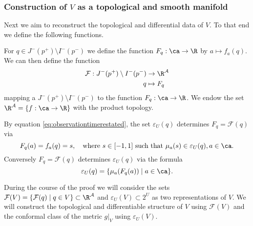 \subsubsection{Construction of $V$ as a topological and smooth manifold}
Next we aim to reconstruct the topological and differential data of $V$. To that end we define the following functions.

For $q\in J^-(p^+)\setminus I^-(p^-)$ we define the function $F_q:\ca\to\R$ by $a\mapsto f_a(q)$. We can then define the function 
\begin{align*}
    \mathcal{F}:J^-(p^+)\setminus I^-(p^-) &\to \R^\mathcal{A}\\
    q&\mapsto F_q
\end{align*} mapping a $J^-(p^+)\setminus I^-(p^-)$ to the function $F_q:\ca\to\R$. We endow the set $\R^\mathcal{A} = \{f:\ca\to \R\}$ with the product topology.

By equation \ref{eq:observationtimerestated}, the set $\varepsilon_U(q)$ determines $F_q=\mathcal{F}(q)$ via
\begin{equation}\label{eq:epsdetfq}
    F_q(a) = f_a(q) = s,\quad \text{where $s\in [-1,1]$ such that $\mu_a(s)\in \varepsilon_U(q), a\in \ca$}.
\end{equation}
Conversely $F_q=\mathcal{F}(q)$ determines $\varepsilon_U(q)$ via the formula
\begin{equation}\label{eq:fqdeteps}
    \varepsilon_U(q) = \{\mu_a(F_q(a)) \mid a\in \ca\}.
\end{equation}

During the course of the proof we will consider the sets $\mathcal{F}(V) = \{\mathcal{F}(q) \mid q\in V\}\subset \R^\mathcal{A}$ and $\varepsilon_U(V)\subset 2^U$ as two representations of $V$. We will construct the topological and differentiable structure of $V$ using $\mathcal{F}(V)$ and the conformal class of the metric $g\rvert_V$ using $\varepsilon_U(V)$.

